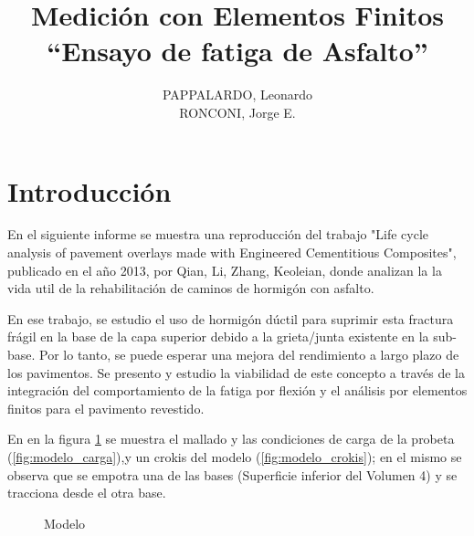 \documentclass[12pt, a4paper]{article}
\begin{document}
\title{ Medición con Elementos Finitos \\ “Ensayo de fatiga de Asfalto” }
\author{PAPPALARDO, Leonardo \\ RONCONI, Jorge E.}
 
\maketitle

\section{Introducción}

En el siguiente informe se muestra una reproducción del trabajo "Life cycle analysis of pavement overlays made with Engineered Cementitious Composites", publicado en el año 2013, por Qian, Li, Zhang, Keoleian,  donde analizan la la vida util de la rehabilitación de caminos de hormigón con asfalto.

En ese trabajo, se estudio el uso de hormigón dúctil para suprimir esta fractura frágil en la base de la capa superior debido a la grieta/junta existente en la sub-base. Por lo tanto, se puede esperar una mejora del rendimiento a largo plazo de los pavimentos. Se presento y estudio la viabilidad de este concepto a través de la integración del comportamiento de la fatiga por flexión y el análisis por elementos finitos para el pavimento revestido.

En en la figura \ref{fig:modelo} se muestra el mallado y las condiciones de carga de la probeta (\ref{fig:modelo_carga}),y un crokis del modelo (\ref{fig:modelo_crokis}); en el mismo se observa que se empotra una de las bases (Superficie inferior del Volumen 4) y se tracciona desde el otra base.

\begin{figure}[h]
	\centering
	\caption{Modelo} \label{fig:modelo}
\end{figure}
\end{document}
